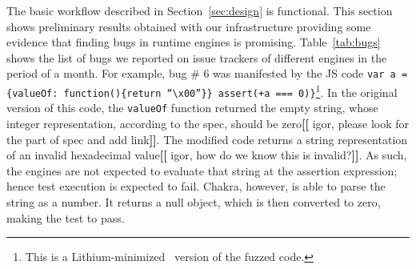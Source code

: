 \documentclass[11pt]{article}
\newcommand{\Fix}[1]{\textbf{[[}{\color{red} #1}\textbf{]]}}
\newcommand{\CodeIn}[1]{{\small\texttt{#1}}}
\begin{document}

The basic workflow described in Section~\ref{sec:design} is functional. This section shows preliminary
results obtained with our infrastructure providing some evidence that finding bugs in runtime engines is
promising. Table~\ref{tab:bugs} shows the list of bugs we reported on
issue trackers of different engines in the period of a month. For
example, bug \# 6 was manifested by the JS code \CodeIn{var a =
  \{valueOf:~function()\{return ``\textbackslash{}x00''\}\} assert(+a
  === 0)\}}\footnote{This is a Lithium-minimized~\cite{lithium}
  version of the fuzzed code.}. In the original version of this code, the \CodeIn{valueOf} function returned
the empty string, whose integer representation, according to the spec,
should be zero\Fix{igor, please look for the part of spec and add link}. The modified
code returns a string representation of an invalid hexadecimal
value\Fix{igor, how do we know this is invalid?}. As such, the engines
are not expected to evaluate that string at the assertion expression;
hence test execution is expected to fail. Chakra,
however, is able to parse the string as a number. It returns a null
object, which is then converted to zero, making the test to pass.
\newcommand{\checkm}{Y}
\newcommand{\crossmark}{N}
\end{document}
